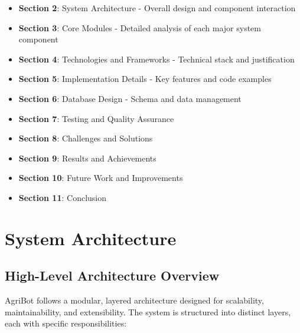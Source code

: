 \documentclass[12pt,a4paper]{article}
\begin{document}
\begin{itemize}[leftmargin=*]
    \item \textbf{Section 2}: System Architecture - Overall design and component interaction
    \item \textbf{Section 3}: Core Modules - Detailed analysis of each major system component
    \item \textbf{Section 4}: Technologies and Frameworks - Technical stack and justification
    \item \textbf{Section 5}: Implementation Details - Key features and code examples
    \item \textbf{Section 6}: Database Design - Schema and data management
    \item \textbf{Section 7}: Testing and Quality Assurance
    \item \textbf{Section 8}: Challenges and Solutions
    \item \textbf{Section 9}: Results and Achievements
    \item \textbf{Section 10}: Future Work and Improvements
    \item \textbf{Section 11}: Conclusion
\end{itemize}

\section{System Architecture}

\subsection{High-Level Architecture Overview}

AgriBot follows a modular, layered architecture designed for scalability, maintainability, and extensibility. The system is structured into distinct layers, each with specific responsibilities:
\end{document}
